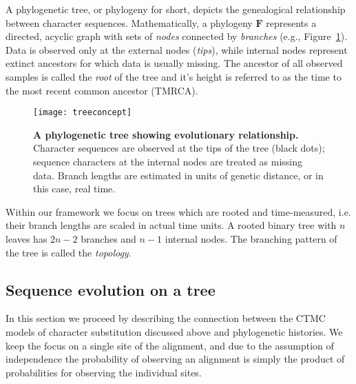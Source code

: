 
A phylogenetic tree, or phylogeny for short, depicts the genealogical relationship between character sequences.
Mathematically, a phylogeny $\mathbf{F}$ represents a directed, acyclic graph with sets of \emph{nodes} connected by \emph{branches} (e.g., Figure~\ref{fig:treeconcept}).
Data is observed only at the external nodes (\emph{tips}), while internal nodes represent extinct ancestors for which data is usually missing.
The ancestor of all observed samples is called the \emph{root} of the tree and it's height is referred to as the time to the most recent common ancestor (TMRCA).

\begin{figure}[H]
\centering
\texttt{[image: treeconcept]} 
\caption{
{ \footnotesize 
{\bf A phylogenetic tree showing evolutionary relationship.} Character sequences are observed at the tips of the tree (black dots); sequence characters at the internal nodes are treated as missing data. 
Branch lengths are estimated in units of genetic distance, or in this case, real time.
} %
}
\label{fig:treeconcept}
\end{figure}

Within our framework we focus on trees which are rooted and time-measured, i.e. their branch lengths are scaled in actual time units.
A rooted binary tree with $n$ leaves has $2n-2$ branches and $n-1$ internal nodes.
The branching pattern of the tree is called the \emph{topology}. 

\subsection{Sequence evolution on a tree\label{sub:evolutionOnTree}}

In this section we proceed by describing the connection between the CTMC models of character substitution discussed above and phylogenetic histories.
We keep the focus on a single site of the alignment, and due to the assumption of independence the probability of observing an alignment is simply the product of probabilities for observing the individual sites.


